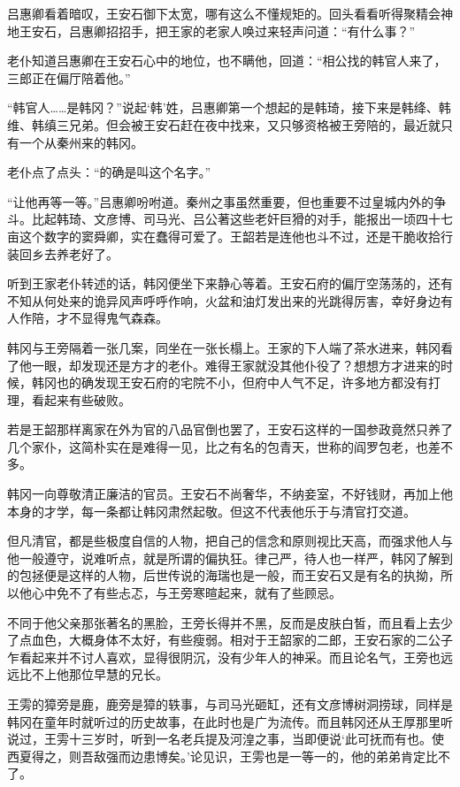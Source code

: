 吕惠卿看着暗叹，王安石御下太宽，哪有这么不懂规矩的。回头看看听得聚精会神地王安石，吕惠卿招招手，把王家的老家人唤过来轻声问道：“有什么事？”

老仆知道吕惠卿在王安石心中的地位，也不瞒他，回道：“相公找的韩官人来了，三郎正在偏厅陪着他。”

“韩官人……是韩冈？”说起‘韩’姓，吕惠卿第一个想起的是韩琦，接下来是韩绛、韩维、韩缜三兄弟。但会被王安石赶在夜中找来，又只够资格被王旁陪的，最近就只有一个从秦州来的韩冈。

老仆点了点头：“的确是叫这个名字。”

“让他再等一等。”吕惠卿吩咐道。秦州之事虽然重要，但也重要不过皇城内外的争斗。比起韩琦、文彦博、司马光、吕公著这些老奸巨猾的对手，能报出一顷四十七亩这个数字的窦舜卿，实在蠢得可爱了。王韶若是连他也斗不过，还是干脆收拾行装回乡去养老好了。

听到王家老仆转述的话，韩冈便坐下来静心等着。王安石府的偏厅空荡荡的，还有不知从何处来的诡异风声呼呼作响，火盆和油灯发出来的光跳得厉害，幸好身边有人作陪，才不显得鬼气森森。

韩冈与王旁隔着一张几案，同坐在一张长榻上。王家的下人端了茶水进来，韩冈看了他一眼，却发现还是方才的老仆。难得王家就没其他仆役了？想想方才进来的时候，韩冈也的确发现王安石府的宅院不小，但府中人气不足，许多地方都没有打理，看起来有些破败。

若是王韶那样离家在外为官的八品官倒也罢了，王安石这样的一国参政竟然只养了几个家仆，这简朴实在是难得一见，比之有名的包青天，世称的阎罗包老，也差不多。

韩冈一向尊敬清正廉洁的官员。王安石不尚奢华，不纳妾室，不好钱财，再加上他本身的才学，每一条都让韩冈肃然起敬。但这不代表他乐于与清官打交道。

但凡清官，都是些极度自信的人物，把自己的信念和原则视比天高，而强求他人与他一般遵守，说难听点，就是所谓的偏执狂。律己严，待人也一样严，韩冈了解到的包拯便是这样的人物，后世传说的海瑞也是一般，而王安石又是有名的执拗，所以他心中免不了有些忐忑，与王旁寒暄起来，就有了些顾忌。

不同于他父亲那张著名的黑脸，王旁长得并不黑，反而是皮肤白皙，而且看上去少了点血色，大概身体不太好，有些瘦弱。相对于王韶家的二郎，王安石家的二公子乍看起来并不讨人喜欢，显得很阴沉，没有少年人的神采。而且论名气，王旁也远远比不上他那位早慧的兄长。

王雱的獐旁是鹿，鹿旁是獐的轶事，与司马光砸缸，还有文彦博树洞捞球，同样是韩冈在童年时就听过的历史故事，在此时也是广为流传。而且韩冈还从王厚那里听说过，王雱十三岁时，听到一名老兵提及河湟之事，当即便说‘此可抚而有也。使西夏得之，则吾敌强而边患博矣。’论见识，王雱也是一等一的，他的弟弟肯定比不了。

